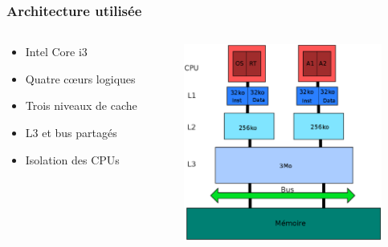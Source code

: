 \documentclass{beamer}
\begin{document}
    \begin{frame}[label=architecture]
    \frametitle{Architecture utilisée}
    \begin{columns}
        \begin{column}{0.6\textwidth}
            \begin{itemize}
                \item Intel Core i3
                \item Quatre c\oe urs logiques
                \item Trois niveaux de cache
                \item L3 et bus partagés
                \item Isolation des CPUs
            \end{itemize}
        \end{column}
        \begin{column}{0.6\textwidth}
            \includegraphics[width=6.5cm]{doc/psar_archi.eps}
        \end{column}
    \end{columns}
    \end{frame}
\end{document}
